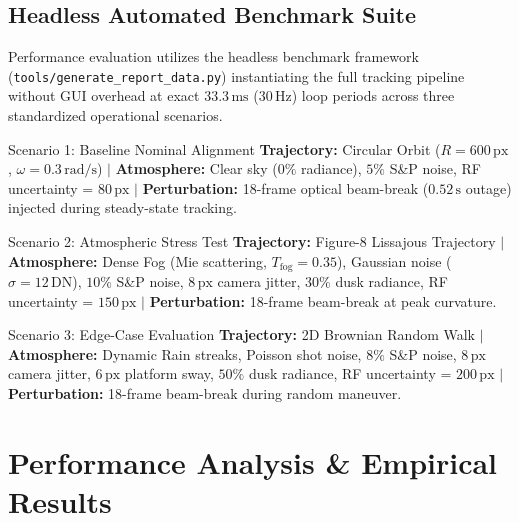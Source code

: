 \documentclass[11pt,a4paper]{article}
\begin{document}
\subsection{Headless Automated Benchmark Suite}
Performance evaluation utilizes the headless benchmark framework (\texttt{tools/generate\_report\_data.py}) instantiating the full tracking pipeline without GUI overhead at exact $33.3\,\text{ms}$ ($30\,\text{Hz}$) loop periods across three standardized operational scenarios.

\begin{scenariobox}{Scenario 1: Baseline Nominal Alignment}
\textbf{Trajectory:} Circular Orbit ($R=600\,\text{px}$, $\omega=0.3\,\text{rad/s}$) $\vert$ \textbf{Atmosphere:} Clear sky ($0\%$ radiance), $5\%$ S\&P noise, RF uncertainty = $80\,\text{px}$ $\vert$ \textbf{Perturbation:} 18-frame optical beam-break ($0.52\,\text{s}$ outage) injected during steady-state tracking.
\end{scenariobox}

\begin{scenariobox}{Scenario 2: Atmospheric Stress Test}
\textbf{Trajectory:} Figure-8 Lissajous Trajectory $\vert$ \textbf{Atmosphere:} Dense Fog (Mie scattering, $T_{\text{fog}} = 0.35$), Gaussian noise ($\sigma=12\,\text{DN}$), $10\%$ S\&P noise, $8\,\text{px}$ camera jitter, $30\%$ dusk radiance, RF uncertainty = $150\,\text{px}$ $\vert$ \textbf{Perturbation:} 18-frame beam-break at peak curvature.
\end{scenariobox}

\begin{scenariobox}{Scenario 3: Edge-Case Evaluation}
\textbf{Trajectory:} 2D Brownian Random Walk $\vert$ \textbf{Atmosphere:} Dynamic Rain streaks, Poisson shot noise, $8\%$ S\&P noise, $8\,\text{px}$ camera jitter, $6\,\text{px}$ platform sway, $50\%$ dusk radiance, RF uncertainty = $200\,\text{px}$ $\vert$ \textbf{Perturbation:} 18-frame beam-break during random maneuver.
\end{scenariobox}

\FloatBarrier

\section{Performance Analysis \& Empirical Results}
\end{document}
